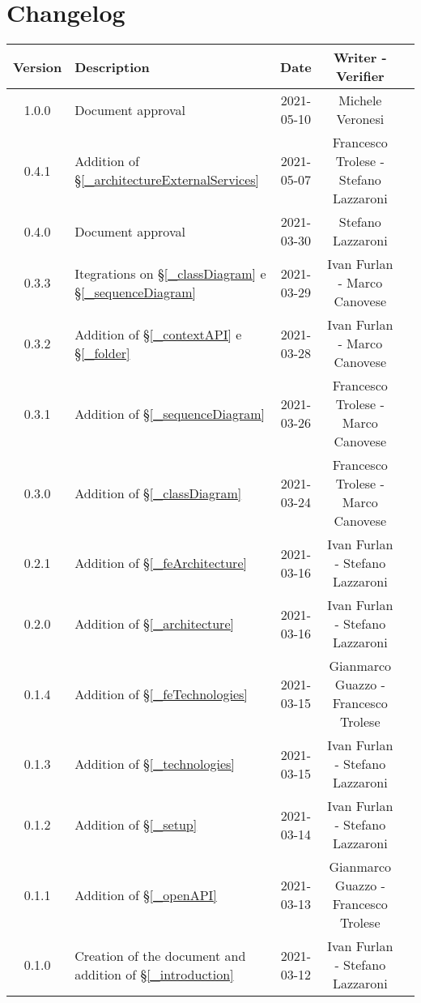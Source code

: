 \section*{Changelog}

\begin{center}
	\begin{longtable}{|c|p{5cm}|c|c|c|}
	\hline
	\rowcolor{lighter-grayer}
	\textbf{Version} & \textbf{Description} & \textbf{Date} & \textbf{Writer - Verifier} \\
	\hline
	\endfirsthead

	\hline
	1.0.0 & Document approval & 2021-05-10 & Michele Veronesi\\
	0.4.1 & Addition of \S\ref{_architectureExternalServices} & 2021-05-07 & Francesco Trolese - Stefano Lazzaroni \\
	0.4.0 & Document approval & 2021-03-30 & Stefano Lazzaroni\\
	0.3.3 & Itegrations on \S\ref{_classDiagram} e \S\ref{_sequenceDiagram} & 2021-03-29 & Ivan Furlan - Marco Canovese \\
	\hline
	0.3.2 & Addition of \S\ref{_contextAPI} e \S\ref{_folder} & 2021-03-28 & Ivan Furlan - Marco Canovese \\
	\hline
	0.3.1 & Addition of \S\ref{_sequenceDiagram} & 2021-03-26 & Francesco Trolese - Marco Canovese \\
	\hline
	0.3.0 & Addition of \S\ref{_classDiagram} & 2021-03-24 & Francesco Trolese - Marco Canovese \\
	\hline
	0.2.1 & Addition of \S\ref{_feArchitecture} & 2021-03-16 & Ivan Furlan - Stefano Lazzaroni \\
	\hline
	0.2.0 & Addition of \S\ref{_architecture} & 2021-03-16 & Ivan Furlan - Stefano Lazzaroni \\
	\hline
	0.1.4 & Addition of \S\ref{_feTechnologies} & 2021-03-15 & Gianmarco Guazzo - Francesco Trolese \\
	\hline
	0.1.3 & Addition of \S\ref{_technologies} & 2021-03-15 & Ivan Furlan - Stefano Lazzaroni \\
	\hline
	0.1.2 & Addition of \S\ref{_setup} & 2021-03-14 & Ivan Furlan - Stefano Lazzaroni \\
	\hline
	0.1.1 & Addition of \S\ref{_openAPI} & 2021-03-13 & Gianmarco Guazzo - Francesco Trolese \\
	\hline
	0.1.0 & Creation of the document and addition of \S\ref{_introduction} & 2021-03-12 & Ivan Furlan - Stefano Lazzaroni\\
	\hline

	\end{longtable}
\end{center}